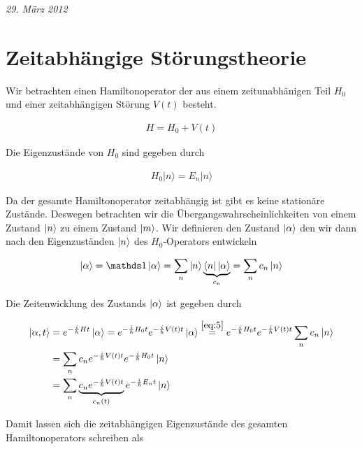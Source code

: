
\usepackage{amsmath}                %
\usepackage{amsfonts}




\textit{29. März 2012}


\section*{Zeitabhängige Störungstheorie}

Wir betrachten einen Hamiltonoperator der aus einem zeitunabhänigen Teil \(H_0\) und einer zeitabhängigen Störung \(V(t)\) besteht.

\begin{align}
  \label{eq:2}
  H=H_0+V(t)
\end{align}

Die Eigenzustände von \(H_0\) sind gegeben durch

\begin{align}
  \label{eq:1}
   H_0 |n\rangle = E_n|n\rangle
\end{align}

Da der gesamte Hamiltonoperator zeitabhängig ist gibt es keine stationäre Zustände. Deswegen betrachten wir die Übergangswahrscheinlichkeiten von einem Zustand \(\left| n \right\rangle\) zu einem Zustand \(\left| m \right\rangle\). Wir definieren den Zustand \(\left| \alpha \right\rangle\) den wir dann nach den Eigenzuständen \(\left| n \right\rangle\) des \(H_0\)-Operators entwickeln

\begin{align}
  \label{eq:5}
  \ket{\alpha} = \mathds 1 \ket{\alpha} = \sum_n \ket{n}\underbr{\bra{n} \ket{\alpha}}_{c_n} = \sum_n c_n \ket{n}
\end{align}

Die Zeitenwicklung des Zustands \(\left| \alpha \right\rangle\) ist gegeben durch

\begin{align}
  \label{eq:6}
  \ket{\alpha,t} &= e^{-\frac{i}{\hbar}Ht}\ket{\alpha} =  e^{-\frac{i}{\hbar}H_0t} e^{-\frac{i}{\hbar}V(t)t}\ket{\alpha} \stackrel{\eqref{eq:5}}= e^{-\frac{i}{\hbar}H_0t} e^{-\frac{i}{\hbar}V(t)t} \sum_n c_n \ket{n} \\
&=\sum_n c_n  e^{-\frac{i}{\hbar}V(t)t} e^{-\frac{i}{\hbar}H_0t} \ket{n} \\
&=\sum_n \underbr{c_n  e^{-\frac{i}{\hbar}V(t)t} }_{c_n(t)}e^{-\frac{i}{\hbar}E_nt} \ket{n}
\end{align}

Damit lassen sich die zeitabhängigen Eigenzustände des gesamten Hamiltonoperators schreiben als

